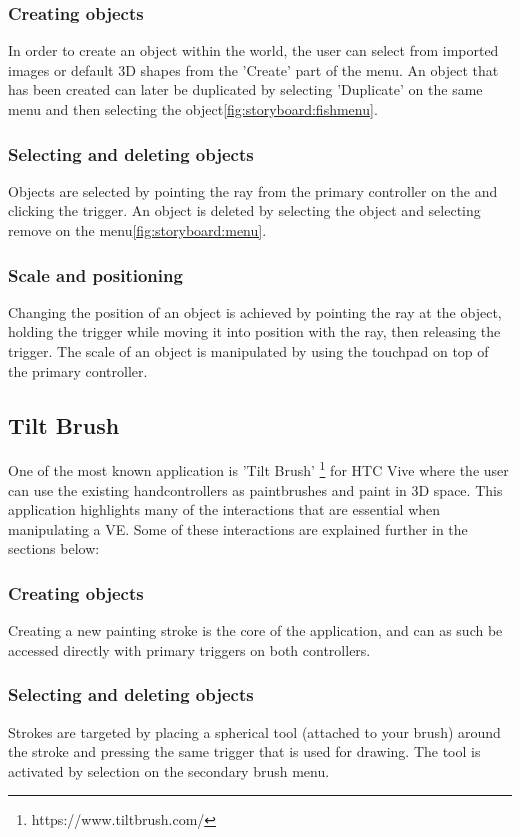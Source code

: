 \subsubsection{Creating objects}
In order to create an object within the world, the user can select from imported images or default 3D shapes from the 'Create' part of the menu. An object that has been created can later be duplicated by selecting 'Duplicate' on the same menu and then selecting the object\ref{fig:storyboard:fishmenu}.
\subsubsection{Selecting and deleting objects}
Objects are selected by pointing the ray from the primary controller on the and clicking the trigger. An object is deleted by selecting the object and selecting remove on the menu\ref{fig:storyboard:menu}.
\subsubsection{Scale and positioning}
Changing the position of an object is achieved by pointing the ray at the object, holding the trigger while moving it into position with the ray, then releasing the trigger. The scale of an object is manipulated by using the touchpad on top of the primary controller.

\subsection{Tilt Brush}
\label{relatedwork:tiltbrush}
 One of the most known application is 'Tilt Brush' \footnote{https://www.tiltbrush.com/} for HTC Vive where the user can use the existing handcontrollers as paintbrushes and paint in 3D space. This application highlights many of the interactions that are essential when manipulating a VE. Some of these interactions are explained further in the sections below:
\subsubsection{Creating objects}
Creating a new painting stroke is the core of the application, and can as such be accessed directly with primary triggers on both controllers.
\subsubsection{Selecting and deleting objects}
Strokes are targeted by placing a spherical tool (attached to your brush) around the stroke and pressing the same trigger that is used for drawing. The tool is activated by selection on the secondary brush menu.
